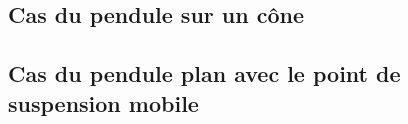 \subsection{Cas du pendule sur un c\^one}

\subsection{Cas du pendule plan avec le point de suspension mobile}